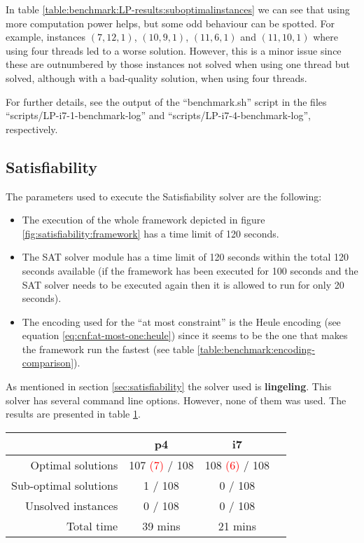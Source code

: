 In table \ref{table:benchmark:LP-results:suboptimalinstances} we can see that using more
computation power helps, but some odd behaviour can be spotted. For example,
instances $(7,12,1)$, $(10,9,1)$, $(11,6,1)$ and $(11,10,1)$  where using four
threads led to a worse solution. However, this is a minor issue since these are
outnumbered by those instances not solved when using one thread but solved,
although with a bad-quality solution, when using four threads.

\hfill

For further details, see the output of the ``benchmark.sh'' script in the files
``scripts/LP-i7-1-benchmark-log'' and ``scripts/LP-i7-4-benchmark-log'', respectively.

\subsection{Satisfiability}
\label{sec:benchmarking:satisfiability}

The parameters used to execute the Satisfiability solver are the following:
\begin{itemize}
	\item The execution of the whole framework depicted in figure \ref{fig:satisfiability:framework}
	has a time limit of 120 seconds.
	\item The SAT solver module has a time limit of 120 seconds within the total 120 seconds
	available (if the framework has been executed for 100 seconds and the SAT solver needs
	to be executed again then it is allowed to run for only 20 seconds).
	\item The encoding used for the ``at most constraint'' is the Heule encoding 
	(see equation \ref{eq:cnf:at-most-one:heule}) since it seems to be the one that makes the framework
	run the fastest (see table \ref{table:benchmark:encoding-comparison}).
\end{itemize}

As mentioned in section \ref{sec:satisfiability} the solver used is \textbf{lingeling}\cite{lingeling}.
This solver has several command line options. However, none of them was used. The results
are presented in table \ref{table:benchmark:SAT-results}.

\begin{table}[H]
\centering
	\begin{tabular}{rccc}
								& p4 	& i7 \\
		\midrule
		Optimal solutions		& 107 \textcolor{red}{(7)} / 108
										& 108 \textcolor{red}{(6)} / 108	 \\
		Sub-optimal solutions	& 1 / 108	& 0 / 108 \\
		Unsolved instances		& 0 / 108	& 0 / 108 \\
		Total time				& 39 mins	& 21 mins \\
	\end{tabular}
	\label{table:benchmark:SAT-results}
\end{table}

